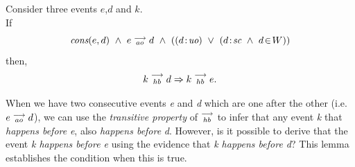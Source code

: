 
\begin{lemma} 
    \label{Lemma1}
    Consider three events $e$,$d$ and $k$. \\

    If
        \[
            \cons{e}{d} \ \wedge \ \reln{e}{ao}{d} \ \wedge \
            (
                (\et{d}{uo}) \ \vee \
                (\et{d}{sc} \ \wedge \ \event{d}{W})
            )
        \]        
    then,
        \[
            k\stackrel{\longrightarrow}{_{hb}}d \Rightarrow k\stackrel{\longrightarrow}{_{hb}}e.
        \]
      
    When we have two consecutive events \textit{e} and \textit{d} which are one after the other (i.e. $e\stackrel{\longrightarrow}{_{ao}}d$), we can use the \textit{transitive property} of $\stackrel{\longrightarrow}{_{hb}}$ to infer that any event \textit{k} that \textit{happens before} \textit{e}, also \textit{happens before} \textit{d}. 
    However, is it possible to derive that the event \textit{k happens before e} using the evidence that \textit{k happens before d}? 
    This lemma establishes the condition when this is true.
    
\end{lemma}

